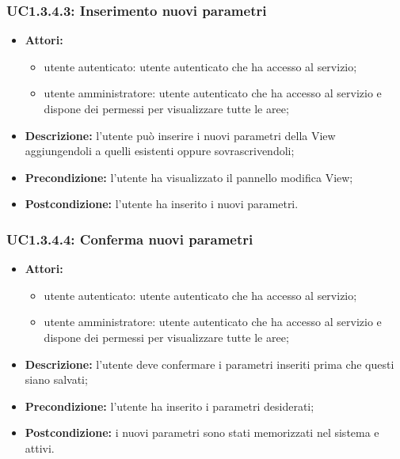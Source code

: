 \subsubsection{UC1.3.4.3: Inserimento nuovi parametri}

\begin{itemize}
    \item \textbf{Attori:}
    \begin{itemize}
    	\item utente autenticato: utente autenticato che ha accesso al servizio;
    	\item utente amministratore: utente autenticato che ha accesso al servizio e dispone dei permessi per visualizzare tutte le aree;
	\end{itemize}
    \item \textbf{Descrizione:} l'utente può inserire i nuovi parametri della View\gloss{} aggiungendoli a quelli esistenti oppure sovrascrivendoli;
    \item \textbf{Precondizione:} l'utente ha visualizzato il pannello modifica View\gloss{};
    \item \textbf{Postcondizione:} l'utente ha inserito i nuovi parametri.
\end{itemize}

\subsubsection{UC1.3.4.4: Conferma nuovi parametri}

\begin{itemize}
    \item \textbf{Attori:}
    \begin{itemize}
    	\item utente autenticato: utente autenticato che ha accesso al servizio;
    	\item utente amministratore: utente autenticato che ha accesso al servizio e dispone dei permessi per visualizzare tutte le aree;
	\end{itemize}
    \item \textbf{Descrizione:} l'utente deve confermare i parametri inseriti prima che questi siano salvati;
    \item \textbf{Precondizione:} l'utente ha inserito i parametri desiderati;
    \item \textbf{Postcondizione:} i nuovi parametri sono stati memorizzati nel sistema e attivi.
\end{itemize}

